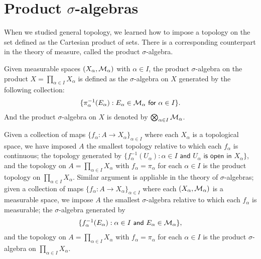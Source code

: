 \section{Product $\sigma$-algebras}

When we studied general topology, we learned how to impose a topology on the set defined as the Cartesian product of sets.
There is a corresponding counterpart in the theory of measure, called the product $\sigma$-algebra.
\begin{defi}
    Given measurable spaces $(X_\alpha, {\mathcal{M}}_\alpha)$ with $\alpha\in I$, the product $\sigma$-algebra on the product $X=\prod_{\alpha\in I}X_\alpha$ is defined as the $\sigma$-algebra on $X$ generated by the following collection:
    \begin{align*}
        \{
            \pi_\alpha^{-1}(E_\alpha)
            :
            \textsf{$E_\alpha\in{\mathcal{M}}_\alpha$ for $\alpha\in I$}
        \}.
    \end{align*}
    And the product $\sigma$-algebra on $X$ is denoted by $\bigotimes_{\alpha\in I}{\mathcal{M}}_\alpha$.
\end{defi}
\begin{rmk}
    Given a collection of maps $\{f_\alpha: A\rightarrow X_\alpha\}_{\alpha\in I}$ where each $X_\alpha$ is a topological space, we have imposed $A$ the smallest topology relative to which each $f_\alpha$ is continuous; the topology generated by $\{f_\alpha^{-1}(U_\alpha): \textsf{$\alpha\in I$ and $U_\alpha$ is open in $X_\alpha$}\}$, and the topology on $A=\prod_{\alpha\in I} X_\alpha$ with $f_\alpha=\pi_\alpha$ for each $\alpha\in I$ is the product topology on $\prod_{\alpha\in I} X_\alpha$.
    Similar argument is appliable in the theory of $\sigma$-algebras; given a collection of maps $\{f_\alpha: A\rightarrow X_\alpha\}_{\alpha\in I}$ where each $(X_\alpha, {\mathcal{M}}_\alpha)$ is a measurable space, we impose $A$ the smallest $\sigma$-algebra relative to which each $f_\alpha$ is measurable; the $\sigma$-algebra generated by
    \begin{align*}
        \{f_\alpha^{-1}(E_\alpha): \textsf{$\alpha\in I$ and $E_\alpha\in{\mathcal{M}}_\alpha$}\},
    \end{align*}
    and the topology on $A=\prod_{\alpha\in I} X_\alpha$ with $f_\alpha=\pi_\alpha$ for each $\alpha\in I$ is the product $\sigma$-algebra on $\prod_{\alpha\in I} X_\alpha$.
\end{rmk}

